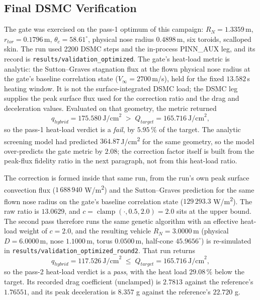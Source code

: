 \subsection{Final DSMC Verification}
The gate was exercised on the pass-1 optimum of this campaign: $R_N = 1.3359$\,m, $r_{tor} = 0.1796$\,m,
$\theta_c = 58.61^\circ$, physical nose radius $0.4898$\,m, six toroids, scalloped skin. The run used
2200 DSMC steps and the in-process PINN\_AUX leg, and its record is
\texttt{results/validation\_optimized}. The gate's heat-load metric is analytic: the
Sutton--Graves stagnation flux at the flown physical nose radius at the gate's baseline
correlation state ($V_\infty = 2700$\,m/s), held for the fixed $13.582$\,s heating window. It is not the surface-integrated
DSMC load; the DSMC leg supplies the peak surface flux used for the correction ratio and the
drag and deceleration values. Evaluated on that geometry, the metric returned
\begin{equation}
    q_{hybrid} = 175.580\ \text{J/cm}^2 \;>\; Q_{target} = 165.716\ \text{J/cm}^2,
    \label{eq:gate_fail}
\end{equation}
so the pass-1 heat-load verdict is a \emph{fail}, by $5.95\,\%$ of the target. The analytic
screening model had predicted $364.87$\,J/cm\textsuperscript{2} for the same geometry, so the model
over-predicts the gate metric by $2.08$; the correction factor itself is built from the
peak-flux fidelity ratio in the next paragraph, not from this heat-load ratio.

The correction is formed inside that same run, from the run's own peak surface convection flux
($1\,688\,940$ W/m\textsuperscript{2}) and the Sutton--Graves prediction for the same flown nose radius
on the gate's baseline correlation state ($129\,293.3$ W/m\textsuperscript{2}). The raw ratio is $13.0629$, and
$c = \operatorname{clamp}(\cdot, 0.5, 2.0) = 2.0$ sits at the upper bound. The second pass
therefore runs the same genetic algorithm with an effective heat-load weight of $c = 2.0$, and the
resulting vehicle $R_N = 3.0000$\,m (physical $D = 6.0000$\,m, nose $1.1000$\,m, torus
$0.0500$\,m, half-cone $45.9656^\circ$) is re-simulated in
\texttt{results/validation\_optimized\_round2}. That run returns
\begin{equation}
    q_{hybrid} = 117.526\ \text{J/cm}^2 \;\leq\; Q_{target} = 165.716\ \text{J/cm}^2,
    \label{eq:gate_pass}
\end{equation}
so the pass-2 heat-load verdict is a \emph{pass}, with the heat load $29.08\,\%$ below the target. Its recorded
drag coefficient (unclamped) is $2.7813$ against the reference's $1.76551$, and its peak
deceleration is $8.357$ g against the reference's $22.720$ g.

